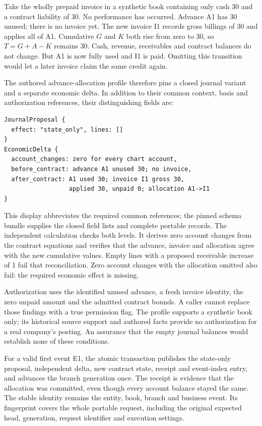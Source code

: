 Take the wholly prepaid invoice in a synthetic book containing only cash 30
and a contract liability of 30. No performance has occurred. Advance A1 has
30 unused; there is no invoice yet. The new invoice I1 records gross billings
of 30 and applies all of A1. Cumulative $G$ and $K$ both rise from zero to 30,
so $T=G+A-K$ remains 30. Cash, revenue, receivables and contract balances do
not change. But A1 is now fully used and I1 is paid. Omitting this transition
would let a later invoice claim the same credit again.

\begin{minipage}{\linewidth}
The authored advance-allocation profile therefore pins a closed journal
variant and a separate economic delta. In addition to their common context,
basis and authorization references, their distinguishing fields are:
\begin{lstlisting}
JournalProposal {
  effect: "state_only", lines: []
}
EconomicDelta {
  account_changes: zero for every chart account,
  before_contract: advance A1 unused 30; no invoice,
  after_contract: A1 used 30; invoice I1 gross 30,
                  applied 30, unpaid 0; allocation A1->I1
}
\end{lstlisting}
\end{minipage}

This display abbreviates the required common references; the pinned schema
bundle supplies the closed field lists and complete portable records. The
independent calculation checks both levels. It derives zero account changes
from the contract equations and verifies that the advance, invoice and
allocation agree with the new cumulative values. Empty lines with a proposed
receivable increase of 1 fail that reconciliation. Zero account changes with
the allocation omitted also fail: the required economic effect is missing.

Authorization uses the identified unused advance, a fresh invoice identity,
the zero unpaid amount and the admitted contract bounds. A caller cannot
replace those findings with a true permission flag. The profile supports a
synthetic book only; its historical source support and authored facts provide
no authorization for a real company's posting. An assurance that the empty
journal balances would establish none of these conditions.

For a valid first event E1, the atomic transaction publishes the state-only
proposal, independent delta, new contract state, receipt and event-index entry,
and advances the branch generation once. The receipt is evidence that the
allocation was committed, even though every account balance stayed the same.
The stable identity remains the entity, book, branch and business event.
Its fingerprint covers the whole portable request, including the original
expected head, generation, request identifier and execution settings.

